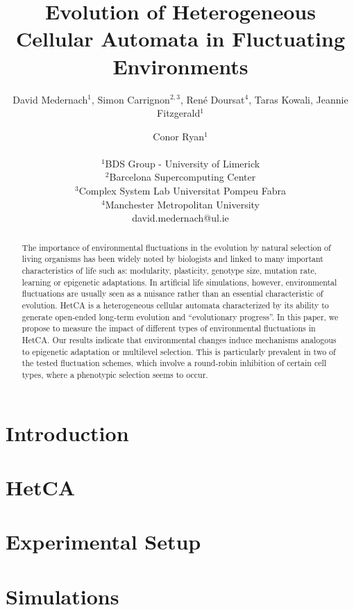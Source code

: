 \documentclass[letterpaper]{article}
\title{Evolution of Heterogeneous Cellular Automata in Fluctuating Environments}
\author{David Medernach$^{1}$, Simon Carrignon$^{2,3}$, René Doursat$^{4}$, Taras Kowali, Jeannie Fitzgerald$^1$ \and Conor Ryan$^1$ \\
\mbox{}\\
$^1$BDS Group - University of Limerick  \\
$^2$Barcelona Supercomputing Center \\
$^3$Complex System Lab Universitat Pompeu Fabra \\
$^4$Manchester Metropolitan University \\
david.medernach@ul.ie}
\begin{document}
\maketitle

\begin{abstract}
The importance of environmental fluctuations in the evolution by natural selection of living organisms has been widely noted by biologists and linked to many important characteristics of life such as: modularity, plasticity, genotype size, mutation rate, learning or epigenetic adaptations. In artificial life simulations, however, environmental fluctuations are usually seen as a nuisance rather than an essential characteristic of evolution. HetCA is a heterogeneous cellular automata characterized by its ability to generate open-ended long-term evolution and ``evolutionary progress''. In this paper, we propose to measure the impact of different types of environmental fluctuations in HetCA. Our results indicate that environmental changes induce mechanisms analogous to epigenetic adaptation or multilevel selection. This is particularly prevalent in two of the tested fluctuation schemes, which involve a round-robin inhibition of certain cell types, where a phenotypic selection seems to occur.
\end{abstract}

\section{Introduction}\label{sec:intro}


%

\section{HetCA}\label{sec:hetca)}


\section{Experimental Setup}\label{sec:exsetup}


\section{Simulations}\label{sec:method}

\end{document}
